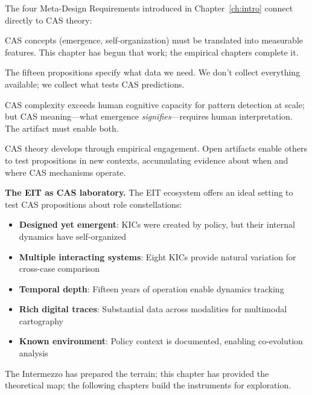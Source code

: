 \documentclass[../main.tex]{subfiles}
\begin{document}
The four Meta-Design Requirements introduced in Chapter~\ref{ch:intro} connect directly to CAS theory:

\begin{description}[leftmargin=0.5cm, itemsep=0.3em]
\item[MDR-1: Theory-Data Reconciliation] CAS concepts (emergence, self-organization) must be translated into measurable features. This chapter has begun that work; the empirical chapters complete it.

\item[MDR-2: Hypothesis-Driven Data Selection] The fifteen propositions specify what data we need. We don't collect everything available; we collect what tests CAS predictions.

\item[MDR-3: Computational-Human Complementarity] CAS complexity exceeds human cognitive capacity for pattern detection at scale; but CAS meaning---what emergence \emph{signifies}---requires human interpretation. The artifact must enable both.

\item[MDR-4: Knowledge Accumulation Infrastructure] CAS theory develops through empirical engagement. Open artifacts enable others to test propositions in new contexts, accumulating evidence about when and where CAS mechanisms operate.
\end{description}

\begin{importantbox}
\textbf{The EIT as CAS laboratory.} The EIT ecosystem offers an ideal setting to test CAS propositions about role constellations:
\begin{itemize}[leftmargin=*, itemsep=0.1em]
\item \textbf{Designed yet emergent}: KICs were created by policy, but their internal dynamics have self-organized
\item \textbf{Multiple interacting systems}: Eight KICs provide natural variation for cross-case comparison
\item \textbf{Temporal depth}: Fifteen years of operation enable dynamics tracking
\item \textbf{Rich digital traces}: Substantial data across modalities for multimodal cartography
\item \textbf{Known environment}: Policy context is documented, enabling co-evolution analysis
\end{itemize}
The Intermezzo has prepared the terrain; this chapter has provided the theoretical map; the following chapters build the instruments for exploration.
\end{importantbox}
\end{document}
